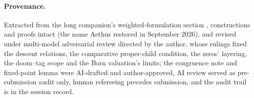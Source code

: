 \begin{lemma}[The base case $M = \mathbb{R}_{\geq 0}$]
\end{lemma}



\paragraph*{Provenance.} Extracted from the long companion's weighted-formulation section \cite{Aethus}, constructions and proofs intact (the name Aethus restored in September 2026), and revised under multi-model adversarial review directed by the author, whose rulings fixed the descent relations, the comparative proper-child condition, the zeros' layering, the doom--tag scope and the Born valuation's limits; the congruence note and fixed-point lemma were AI-drafted and author-approved, AI review served as pre-submission audit only, human refereeing precedes submission, and the audit trail is in the session record.


\appendix
